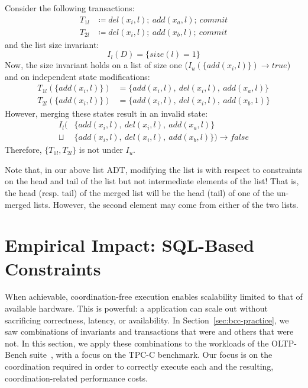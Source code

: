\begin{claim}
Consider the following transactions:
\begin{align*}
T_{1l}&\coloneqq del(x_i, l);~add(x_a, l);~commit\\
T_{2l}&\coloneqq del(x_i, l);~add(x_b, l);~commit
\end{align*}
and the list size invariant:
$$I_l(D) = \{size(l) = 1\}$$
Now, the size invariant holds on a list of size one ($I_u(\{add(x_i, l)\}) \rightarrow true$) and on independent state modifications:
\begin{align*}
T_{1l}(\{add(x_i, l)\})&=\{add(x_i, l),~del(x_i, l),~add(x_a, l)\}\\
T_{2l}(\{add(x_i, l)\})&=\{add(x_i, l),~del(x_i, l),~add(x_b,1)\}
\end{align*}
However, merging these states result in an invalid state:
\begin{align*}
I_l(&\{add(x_i, l),~del(x_i, l),~add(x_a, l)\}\\\sqcup~&\{add(x_i, l),~del(x_i, l),~add(x_b, l)\})\rightarrow false
\end{align*}
Therefore, $\{T_{1l}, T_{2l}\}$ is not \iconfluent under $I_u$.
\end{claim}

Note that, in our above list ADT, modifying the list is \iconfluent with respect to constraints on the head and tail of the list but not intermediate elements of the list! That is, the head (resp. tail) of the merged list will be the head (tail) of one of the un-merged lists. However, the second element may come from either of the two lists.


\section{Empirical Impact: SQL-Based Constraints}
\label{sec:evaluation}

When achievable, coordination-free execution enables scalability
limited to that of available hardware. This is powerful: a
\iconfluent application can scale out without
sacrificing correctness, latency, or availability. In
Section~\ref{sec:bcc-practice}, we saw combinations of invariants
and transactions that were \iconfluent and others that were not. In this
section, we apply these combinations to the workloads of the
OLTP-Bench suite~\cite{oltpbench}, with a focus on the TPC-C
benchmark. Our focus is on the coordination required in order to
correctly execute each and the resulting, coordination-related
performance costs.

